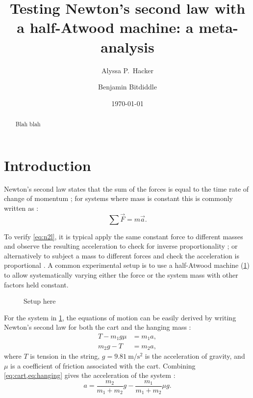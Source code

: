 \documentclass[reprint,amsmath,amssymb,aps,twoside]{revtex4-2}
\begin{document}
\setcounter{page}{1}
\title{Testing Newton's second law with a half-Atwood machine: a meta-analysis}

\author{Alyssa P.~Hacker}
\author{Benjamin Bitdiddle}
\date{\today}

\begin{abstract}
Blah blah
\end{abstract}


\maketitle\thispagestyle{mytitlepage}





\section{Introduction}
Newton's second law states that the sum of the forces is equal to the time rate of change of momentum \cite{newton1687principia}; for systems where mass is constant this is commonly written as \cite{tipler, barrons}:
\begin{equation}
\sum\vec{F} = m\vec{a}.
\label{eq:n2l}
\end{equation}

To verify \cref{eq:n2l}, it is typical apply the same constant force to different masses and observe the resulting acceleration to check for inverse proportionality \cite{arenas-2024-testing,avalur-2024-verifying,canada-2024-experimental,kishore-2024-relationship,yagnyeshwaran-2024-verifying}; or alternatively to subject a mass to different forces and check the acceleration is proportional \cite{govardhanen-2024-newtons,kedharnath-2024-examining,krasnopolsky-2024-testing}. A common experimental setup is to use a half-Atwood machine (\cref{fig:setup}) to allow systematically varying either the force or the system mass with other factors held constant. 
\begin{figure}
\caption{\label{fig:setup} Setup here}
\end{figure}

For the system in \cref{fig:setup}, the equations of motion can be easily derived by writing Newton's second law for both the cart and the hanging mass \cite{tipler, barrons}:
\begin{align}
T - m_1 g \mu &= m_1 a, \label{eq:cart}\\
m_2 g - T &= m_2 a, \label{eq:hanging}
\end{align}
where $T$ is tension in the string, $g=\qty{9.81}{\meter\per\second\squared}$ is the acceleration of gravity, and $\mu$ is a coefficient of friction associated with the cart. Combining \cref{eq:cart,eq:hanging} gives the acceleration of the system \cite{tipler,barrons}:
\begin{equation}
a = \dfrac{m_2}{m_1+m_2} g - \dfrac{m_1}{m_1+m_2} \mu g.
\label{eq:fricdimensional}
\end{equation}
\end{document}
